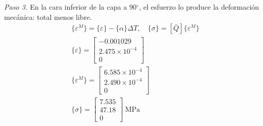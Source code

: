 \documentclass[11pt]{article}
\begin{document}
\textit{Paso 3.} En la cara inferior de la capa a 90\ensuremath{^\circ}, el esfuerzo lo produce la deformación mecánica: total menos libre.
\begin{align*}
&\{\varepsilon^M\}=\{\varepsilon\}-\{\alpha\}\Delta T,\quad \{\sigma\}=[\bar Q]\{\varepsilon^M\} \\
&\{\varepsilon\}=\begin{bmatrix}-0.001029 \\ 2.475\times10^{-4} \\ 0\end{bmatrix} \\
&\{\varepsilon^M\}=\begin{bmatrix}6.585\times10^{-4} \\ 2.490\times10^{-4} \\ 0\end{bmatrix} \\
&\{\sigma\}=\begin{bmatrix}7.535 \\ 47.18 \\ 0\end{bmatrix}\ \mathrm{MPa}
\end{align*}
\end{document}
